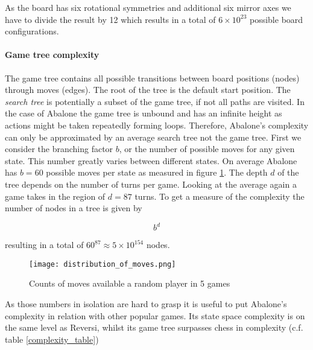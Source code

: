 As the board has six rotational symmetries and additional six mirror axes we have to divide the result by 12 which results in a total of $ 6 \times 10^{23} $ possible board configurations. \cite[p. 4]{lemmens_constructing_2005}

\paragraph{Game tree complexity} The game tree contains all possible transitions between board positions (nodes) through moves (edges). The root of the tree is the default start position. The \textit{search tree} is potentially a subset of the game tree, if not all paths are visited. In the case of Abalone the game tree is unbound and has an infinite height as actions might be taken repeatedly forming loops. Therefore, Abalone's complexity can only be approximated by an average search tree not the game tree. First we consider the branching factor $ b $, or the number of possible moves for any given state. This number greatly varies between different states. On average Abalone has $ b = 60 $ possible moves per state as measured in figure \ref{branching_factor}. The depth $ d $ of the tree depends on the number of turns per game. Looking at the average again a game takes in the region of $ d = 87 $ turns. To get a measure of the complexity the number of nodes in a tree is given by

\begin{equation}
    b^d
\end{equation}

resulting in a total of $60^{87} \approx 5 \times 10^{154}$ nodes. \cite{lemmens_constructing_2005}

\begin{figure}
    \centering
    \texttt{[image: distribution\_of\_moves.png]}
    \caption{Counts of moves available a random player in 5 games}
    \label{branching_factor}
\end{figure}

As those numbers in isolation are hard to grasp it is useful to put Abalone's complexity in relation with other popular games. Its state space complexity is on the same level as Reversi, whilst its game tree surpasses chess in complexity (c.f. table \ref{complexity_table})

